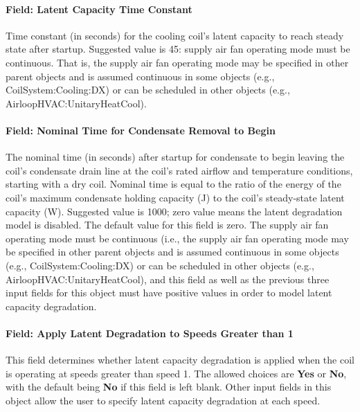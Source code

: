\paragraph{Field: Latent Capacity Time Constant}\label{field-latent-capacity-time-constant}

Time constant (in seconds) for the cooling coil's latent capacity to reach steady state after startup. Suggested value is 45: supply air fan operating mode must be continuous. That is, the supply air fan operating mode may be specified in other parent objects and is assumed continuous in some objects (e.g., CoilSystem:Cooling:DX) or can be scheduled in other objects (e.g., AirloopHVAC:UnitaryHeatCool).

\paragraph{Field: Nominal Time for Condensate Removal to Begin}\label{field-nominal-time-for-condensate-removal-to-begin}

The nominal time (in seconds) after startup for condensate to begin leaving the coil's condensate drain line at the coil's rated airflow and temperature conditions, starting with a dry coil. Nominal time is equal to the ratio of the energy of the coil's maximum condensate holding capacity (J) to the coil's steady-state latent capacity (W). Suggested value is 1000; zero value means the latent degradation model is disabled. The default value for this field is zero. The supply air fan operating mode must be continuous (i.e., the supply air fan operating mode may be specified in other parent objects and is assumed continuous in some objects (e.g., CoilSystem:Cooling:DX) or can be scheduled in other objects (e.g., AirloopHVAC:UnitaryHeatCool), and this field as well as the previous three input fields for this object must have positive values in order to model latent capacity degradation.

\paragraph{Field: Apply Latent Degradation to Speeds Greater than 1}\label{field-apply-latent-degradation-to-speeds-greater-than-1}

This field determines whether latent capacity degradation is applied when the coil is operating at speeds greater than speed 1. The allowed choices are \textbf{Yes} or \textbf{No}, with the default being \textbf{No} if this field is left blank. Other input fields in this object allow the user to specify latent capacity degradation at each speed.

